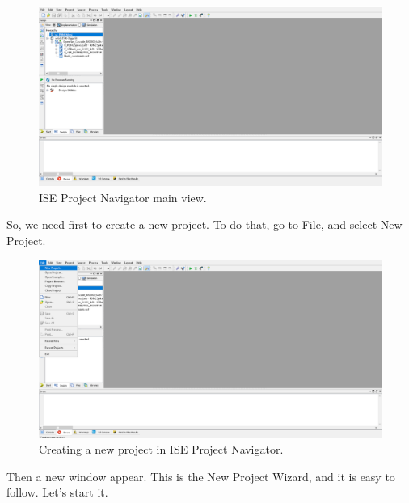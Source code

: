 \begin{figure}[H]
\centering
\includegraphics[width=1\textwidth]{images/Img27_ISE_Init.PNG}
\caption{\label{fig:ISE_main_windows}ISE Project Navigator main view.}
\end{figure}

So, we need first to create a new project. To do that, go to File, and select New Project.

\begin{figure}[H]
\centering
\includegraphics[width=1\textwidth]{images/Img28_File_NewProject.PNG}
\caption{\label{fig:ISE_create_project}Creating a new project in ISE Project Navigator.}
\end{figure}

Then a new window appear. This is the New Project Wizard, and it is easy to follow. Let's start it.

